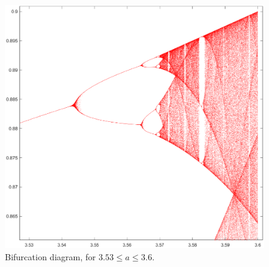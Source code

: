 \documentclass[twocolumn,amsmath,amssymb,aps]{revtex4}
\begin{document}
\begin{figure}[!htb]
	\centering
	\includegraphics[scale=0.35]{logistic_4_top_branch_1}
	\caption{Bifurcation diagram, for $3.53 \leq a \leq 3.6$.}
	\label{fig:logistic_4}
\end{figure}
\end{document}
